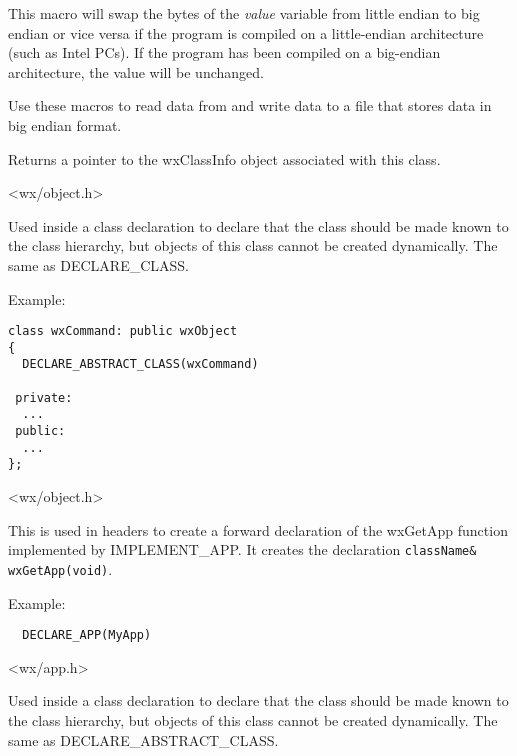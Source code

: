 This macro will swap the bytes of the {\it value} variable from little
endian to big endian or vice versa if the program is compiled on a
little-endian architecture (such as Intel PCs). If the program has 
been compiled on a big-endian architecture, the value will be unchanged.

Use these macros to read data from and write data to a file that stores 
data in big endian format.

\label{classinfo}


Returns a pointer to the wxClassInfo object associated with this class.


<wx/object.h>



Used inside a class declaration to declare that the class should be
made known to the class hierarchy, but objects of this class cannot be created
dynamically. The same as DECLARE\_CLASS.

Example:

\begin{verbatim}
class wxCommand: public wxObject
{
  DECLARE_ABSTRACT_CLASS(wxCommand)

 private:
  ...
 public:
  ...
};
\end{verbatim}


<wx/object.h>

\label{declareapp}


This is used in headers to create a forward declaration of the wxGetApp function implemented
by IMPLEMENT\_APP. It creates the declaration {\tt className\& wxGetApp(void)}.

Example:

\begin{verbatim}
  DECLARE_APP(MyApp)
\end{verbatim}


<wx/app.h>



Used inside a class declaration to declare that the class should be
made known to the class hierarchy, but objects of this class cannot be created
dynamically. The same as DECLARE\_ABSTRACT\_CLASS.

